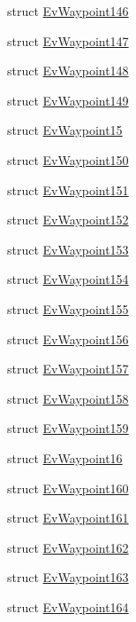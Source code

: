 \begin{DoxyCompactItemize}
struct \hyperlink{structmove__base__z__client_1_1EvWaypoint146}{Ev\+Waypoint146}
\item 
struct \hyperlink{structmove__base__z__client_1_1EvWaypoint147}{Ev\+Waypoint147}
\item 
struct \hyperlink{structmove__base__z__client_1_1EvWaypoint148}{Ev\+Waypoint148}
\item 
struct \hyperlink{structmove__base__z__client_1_1EvWaypoint149}{Ev\+Waypoint149}
\item 
struct \hyperlink{structmove__base__z__client_1_1EvWaypoint15}{Ev\+Waypoint15}
\item 
struct \hyperlink{structmove__base__z__client_1_1EvWaypoint150}{Ev\+Waypoint150}
\item 
struct \hyperlink{structmove__base__z__client_1_1EvWaypoint151}{Ev\+Waypoint151}
\item 
struct \hyperlink{structmove__base__z__client_1_1EvWaypoint152}{Ev\+Waypoint152}
\item 
struct \hyperlink{structmove__base__z__client_1_1EvWaypoint153}{Ev\+Waypoint153}
\item 
struct \hyperlink{structmove__base__z__client_1_1EvWaypoint154}{Ev\+Waypoint154}
\item 
struct \hyperlink{structmove__base__z__client_1_1EvWaypoint155}{Ev\+Waypoint155}
\item 
struct \hyperlink{structmove__base__z__client_1_1EvWaypoint156}{Ev\+Waypoint156}
\item 
struct \hyperlink{structmove__base__z__client_1_1EvWaypoint157}{Ev\+Waypoint157}
\item 
struct \hyperlink{structmove__base__z__client_1_1EvWaypoint158}{Ev\+Waypoint158}
\item 
struct \hyperlink{structmove__base__z__client_1_1EvWaypoint159}{Ev\+Waypoint159}
\item 
struct \hyperlink{structmove__base__z__client_1_1EvWaypoint16}{Ev\+Waypoint16}
\item 
struct \hyperlink{structmove__base__z__client_1_1EvWaypoint160}{Ev\+Waypoint160}
\item 
struct \hyperlink{structmove__base__z__client_1_1EvWaypoint161}{Ev\+Waypoint161}
\item 
struct \hyperlink{structmove__base__z__client_1_1EvWaypoint162}{Ev\+Waypoint162}
\item 
struct \hyperlink{structmove__base__z__client_1_1EvWaypoint163}{Ev\+Waypoint163}
\item 
struct \hyperlink{structmove__base__z__client_1_1EvWaypoint164}{Ev\+Waypoint164}

\end{DoxyCompactItemize}
